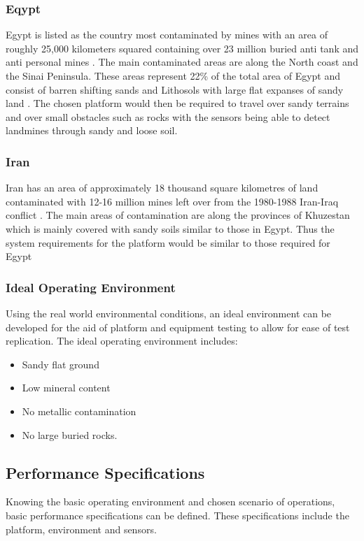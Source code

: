 \documentclass[main.tex]{subfiles}
\begin{document}
\subsubsection{Eqypt}
Egypt is listed as the country most contaminated by mines with an area of roughly 25,000 kilometers squared containing over 23 million buried anti tank and anti personal mines \parencite{Rushfan2008}. The main contaminated areas are along the North coast and the Sinai Peninsula. These areas represent 22\% of the total area of Egypt and consist of barren shifting sands and Lithosols with large flat expanses of sandy land \parencite{Nahrawy2011}. 
 The chosen platform would then be required to travel over sandy terrains and over small obstacles such as rocks with the sensors being able to detect landmines through sandy and loose soil. 
 \subsubsection{Iran}
 Iran has an area of approximately 18 thousand square kilometres of land contaminated with 12-16 million mines left over from the 1980-1988 Iran-Iraq conflict \parencite{landmineMonitor2015}. The main areas of contamination are along the provinces of Khuzestan which is mainly covered with sandy soils similar to those in Egypt. Thus the system requirements for the platform would be similar to those required for Egypt
 \subsubsection{Ideal Operating Environment}
 Using the real world environmental conditions, an ideal environment can be developed for the aid of platform and equipment testing to allow for ease of test replication. The ideal operating environment includes: \textbf{\color{red}{THIS IS A LITTLE TRICKY TO READ - CONSIDER REWORDING}}
 \begin{itemize}
 \item Sandy flat ground 
 \item Low mineral content
 \item No metallic contamination 
 \item No large buried rocks.
 \end{itemize}
\subsection{Performance Specifications}
 Knowing the basic operating environment and chosen scenario of operations, basic performance specifications can be defined. These specifications include the platform, environment and sensors.
\end{document}
